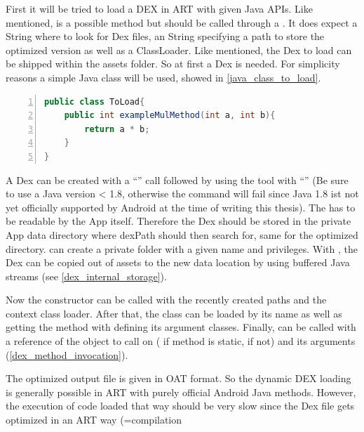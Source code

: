 First it will be tried to load a DEX in ART with given Java APIs.
Like mentioned,  is a possible method but should be called
through a . It does expect a  String where to look for Dex files, an  String specifying a path to store the optimized version as well as a  ClassLoader.
Like mentioned, the Dex to load can be shipped within the assets folder.
So at first a Dex is needed. For simplicity reasons a simple Java class will be used, showed in \autoref{java_class_to_load}.
\begin{lstlisting}[language=Java, caption=Java Class to load, label=java_class_to_load, numbers=left]
public class ToLoad{
    public int exampleMulMethod(int a, int b){
        return a * b;
    }
}
\end{lstlisting}
A Dex can be created with a ``'' call followed by
using the  tool with ``'' (Be sure to use a Java version < 1.8, otherwise the 
command will fail since Java 1.8 ist not yet officially supported by Android at the time
of writing this thesis).
The  has to be readable by the App itself. Therefore
the Dex should be stored in the private App data directory where dexPath should then
search for, same for the optimized directory.
 can create a private folder with a given name
and privileges. With , the Dex can be
copied out of assets to the new data location by using buffered Java streams (see \autoref{dex_internal_storage}).

Now the  constructor can be called with the recently
created paths and the context class loader. After that, the class can be loaded
by its name as well as getting the method with defining its argument classes.
Finally,  can be called with a reference of the object to call
on ( if method is static,  if not) and its
arguments (\autoref{dex_method_invocation}).

The optimized output file is given in OAT format.
So the dynamic DEX loading is generally possible in ART with purely official
Android Java methods. However, the execution of code loaded that way should
be very slow since the Dex file gets optimized in an ART way (=compilation
